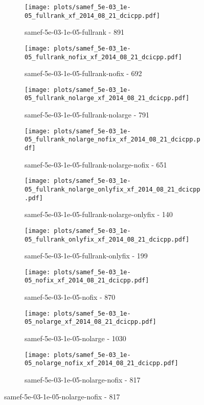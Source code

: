 \begin{figure}[H]
  \centering
  \begin{subfigure}{0.48\textwidth}
    \texttt{[image: plots/samef\_5e-03\_1e-05\_fullrank\_xf\_2014\_08\_21\_dcicpp.pdf]}
    \caption{samef-5e-03-1e-05-fullrank - 891}
  \end{subfigure}
  \begin{subfigure}{0.48\textwidth}
    \texttt{[image: plots/samef\_5e-03\_1e-05\_fullrank\_nofix\_xf\_2014\_08\_21\_dcicpp.pdf]}
    \caption{samef-5e-03-1e-05-fullrank-nofix - 692}
  \end{subfigure}
  \begin{subfigure}{0.48\textwidth}
    \texttt{[image: plots/samef\_5e-03\_1e-05\_fullrank\_nolarge\_xf\_2014\_08\_21\_dcicpp.pdf]}
    \caption{samef-5e-03-1e-05-fullrank-nolarge - 791}
  \end{subfigure}
  \begin{subfigure}{0.48\textwidth}
    \texttt{[image: plots/samef\_5e-03\_1e-05\_fullrank\_nolarge\_nofix\_xf\_2014\_08\_21\_dcicpp.pdf]}
    \caption{samef-5e-03-1e-05-fullrank-nolarge-nofix - 651}
  \end{subfigure}
  \begin{subfigure}{0.48\textwidth}
    \texttt{[image: plots/samef\_5e-03\_1e-05\_fullrank\_nolarge\_onlyfix\_xf\_2014\_08\_21\_dcicpp.pdf]}
    \caption{samef-5e-03-1e-05-fullrank-nolarge-onlyfix - 140}
  \end{subfigure}
  \begin{subfigure}{0.48\textwidth}
    \texttt{[image: plots/samef\_5e-03\_1e-05\_fullrank\_onlyfix\_xf\_2014\_08\_21\_dcicpp.pdf]}
    \caption{samef-5e-03-1e-05-fullrank-onlyfix - 199}
  \end{subfigure}
  \begin{subfigure}{0.48\textwidth}
    \texttt{[image: plots/samef\_5e-03\_1e-05\_nofix\_xf\_2014\_08\_21\_dcicpp.pdf]}
    \caption{samef-5e-03-1e-05-nofix - 870}
  \end{subfigure}
  \begin{subfigure}{0.48\textwidth}
    \texttt{[image: plots/samef\_5e-03\_1e-05\_nolarge\_xf\_2014\_08\_21\_dcicpp.pdf]}
    \caption{samef-5e-03-1e-05-nolarge - 1030}
  \end{subfigure}
  \begin{subfigure}{0.48\textwidth}
    \texttt{[image: plots/samef\_5e-03\_1e-05\_nolarge\_nofix\_xf\_2014\_08\_21\_dcicpp.pdf]}
    \caption{samef-5e-03-1e-05-nolarge-nofix - 817}

\end{subfigure}
\end{figure}
